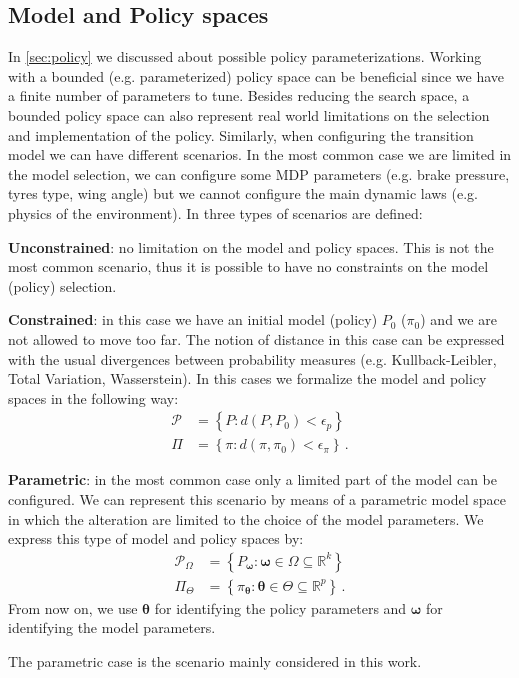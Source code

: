\subsection{Model and Policy spaces}
In \cref{sec:policy} we discussed about possible policy parameterizations. Working with a bounded (e.g. parameterized) policy space can be beneficial since we have a finite number of parameters to tune. Besides reducing the search space, a bounded policy space can also represent real world limitations on the selection and implementation of the policy.
Similarly, when configuring the transition model we can have different scenarios. In the most common case we are limited in the model selection, we can configure some MDP parameters (e.g. brake pressure, tyres type, wing angle) but we cannot configure the main dynamic laws (e.g. physics of the environment).
In \citep{cmdp} three types of scenarios are defined:
\begin{description}
	\item \textbf{Unconstrained}: no limitation on the model and policy spaces. This is not the most common scenario, thus it is possible to have no constraints on the model (policy) selection.
	\item \textbf{Constrained}: in this case we have an initial model (policy) $P_0$ ($\pi_0$) and we are not allowed to move too far. The notion of distance in this case can be expressed with the usual divergences between probability measures (e.g. Kullback-Leibler, Total Variation, Wasserstein). In this cases we formalize the model and policy spaces in the following way: \begin{align}
		\mathcal{P} &= \left\{ P : d(P,P_0)< \epsilon_p \right\} \\
		\Pi &= \left\{ \pi : d(\pi,\pi_0)< \epsilon_\pi \right\} \, .
		\end{align}
		\item \textbf{Parametric}: in the most common case only a limited part of the model can be configured. We can represent this scenario by means of a parametric model space in which the alteration are limited to the choice of the model parameters. 
			We express this type of model and policy spaces by:
			\begin{align}
			\mathcal{P}_\Omega &= \left\{ P_{\boldsymbol{\omega}} : \boldsymbol{\omega} \in \Omega \subseteq \mathbb{R}^k \right\} \\
			\Pi_\Theta &=  \left\{ \pi_{\boldsymbol{\theta}} : \boldsymbol{\theta} \in \Theta \subseteq \mathbb{R}^p \right\} \,.
			\end{align}
			From now on, we use $\boldsymbol{\theta}$ for identifying the policy parameters and $\boldsymbol{\omega}$ for identifying the model parameters.
\end{description}
The parametric case is the scenario mainly considered in this work.

